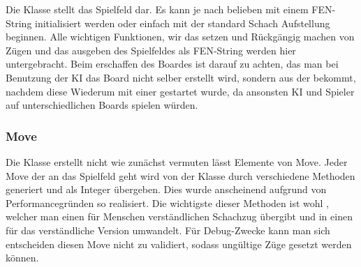 Die Klasse  stellt das Spielfeld dar. Es kann je nach belieben mit 
einem FEN-String initialisiert werden oder einfach mit der standard Schach 
Aufstellung beginnen. Alle wichtigen Funktionen, wir das setzen und Rückgängig 
machen von Zügen und das ausgeben des Spielfeldes als FEN-String werden hier 
untergebracht. Beim erschaffen des Boardes ist darauf zu achten, das man bei 
Benutzung der KI das Board nicht selber erstellt wird, sondern aus der 
 bekommt, nachdem diese Wiederum mit einer  
gestartet wurde, da ansonsten KI und Spieler auf unterschiedlichen Boards 
spielen würden.

\subsubsection{Move}

Die Klasse  erstellt nicht wie zunächst vermuten lässt Elemente von 
Move. Jeder Move der an das Spielfeld geht wird von der Klasse  durch 
verschiedene Methoden generiert und als Integer übergeben. Dies wurde 
anscheinend aufgrund von Performancegründen so realisiert. Die wichtigste dieser 
Methoden ist wohl , welcher man einen für Menschen 
verständlichen Schachzug übergibt und in einen für das  
verständliche Version umwandelt. Für Debug-Zwecke kann man sich entscheiden 
diesen Move nicht zu validiert, sodass ungültige Züge gesetzt werden können.